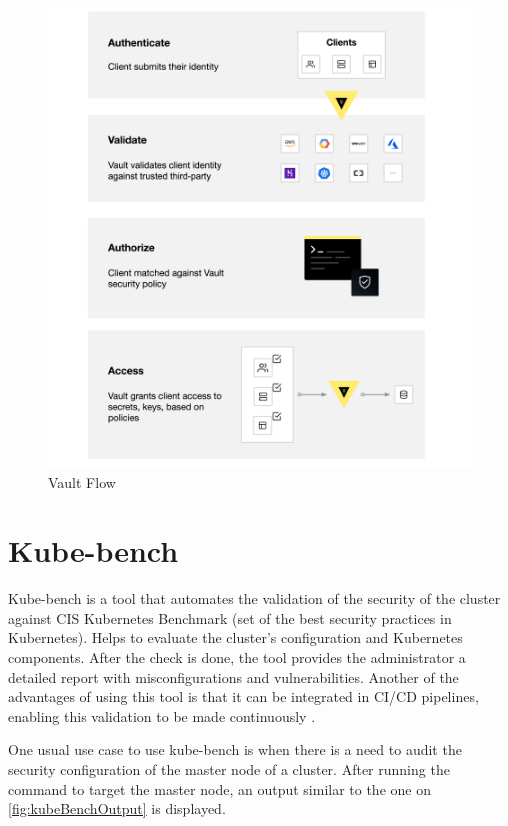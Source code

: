 \documentclass[a4paper,11pt,openright,BCOR=15mm]{scrbook}
\begin{document}
\begin{figure}[h!]
	\centering
	\label{fig:vaultFlow}
	\includegraphics[scale=0.2]{figs/vault-flow.png}
	\caption{Vault Flow \cite{vault_doc_introduction_nodate}}
\end{figure}

\section{Kube-bench}\label{sect:complementCIS}

Kube-bench is a tool that automates the validation of the security of the cluster against CIS Kubernetes Benchmark (set of the best security practices in Kubernetes). Helps to evaluate the cluster’s configuration and Kubernetes components. After the check is done, the tool provides the administrator a detailed report with misconfigurations and vulnerabilities. Another of the advantages of using this tool is that it can be integrated in CI/CD pipelines, enabling this validation to be made continuously \cite{benhassan_depth_2024} \cite{noauthor_aquasecurity_kube_bench_2024}.

One usual use case to use kube-bench is when there is a need to audit the security configuration of the master node of a cluster. After running the command to target the master node, an output similar to the one on \ref{fig:kubeBenchOutput} is displayed.
\end{document}
